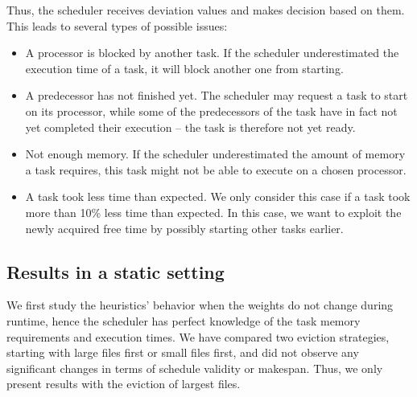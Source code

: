 \documentclass[conference]{IEEEtran}
\begin{document}
Thus, the scheduler receives deviation values and makes decision based on them.
This leads to several types of possible issues:
%
\begin{itemize}
\item 
  A processor is blocked by another task. If the scheduler underestimated the execution time of a task,
  it will block another one from starting.
\item 
  A predecessor has not finished yet.
  The scheduler may request a task to start on its processor, while
  some of the predecessors of the task have in fact not yet completed their execution -- 
  the task is therefore not yet ready.
\item 
  Not enough memory. If the scheduler underestimated the amount of memory a task requires, this task might not be able to execute on a chosen processor.
\item 
  A task took less time than expected. We only consider this case if a task took more than 10\% less
  time than expected. In this case, we want to exploit the newly acquired free time by possibly starting other tasks earlier.
\end{itemize}


\subsection{Results in a static setting}
\label{sec.expe.static}
%
We first study the heuristics' behavior when the weights do not change during runtime,
hence the scheduler has perfect knowledge of the task memory requirements and execution times.
We have compared two eviction strategies, starting with large files first or small files first,
and did not observe any significant changes in terms of schedule validity or makespan.
Thus, we only present results with the eviction of largest files. %
\end{document}
